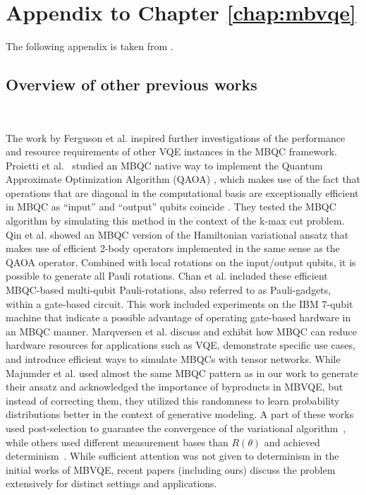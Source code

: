 \documentclass[../main.tex]{subfiles}
\begin{document}
\section{Appendix to Chapter \ref{chap:mbvqe}}

The following appendix is taken from \cite{schroeder2024deterministic}.

\subsection{Overview of other previous works}~\label{app:overview}

The work by Ferguson et al. \cite{ferguson2021measurement} inspired further investigations of the performance and resource requirements of other VQE instances in the MBQC framework. Proietti et al.~\cite{proietti2022native} studied an MBQC native way to implement the Quantum Approximate Optimization Algorithm (QAOA) \cite{farhi2014a}, which makes use of the fact that operations that are diagonal in the computational basis are exceptionally efficient in MBQC as ``input'' and  ``output'' qubits coincide \cite{browne2006one}. They tested the MBQC algorithm by simulating this method in the context of the k-max cut problem.
Qin et al. \cite{qin2023applicability} showed an MBQC version of the Hamiltonian variational ansatz \cite{wecker2015progress} that makes use of efficient 2-body operators implemented in the same sense as the QAOA operator. Combined with local rotations on the input/output qubits, it is possible to generate all Pauli rotations.
Chan et al. \cite{chan2023hybrid} included these efficient MBQC-based multi-qubit Pauli-rotations, also referred to as Pauli-gadgets, within a gate-based circuit. This work included experiments on the IBM 7-qubit machine that indicate a possible advantage of operating gate-based hardware in an MBQC manner.
Marqversen et al. \cite{marqversen2023applications} discuss and exhibit how MBQC can reduce hardware resources for applications such as VQE, demonstrate specific use cases, and introduce efficient ways to simulate MBQCs with tensor networks.
While Majumder et al. \cite{majumder2023variational} used almost the same MBQC pattern as in our work to generate their ansatz and acknowledged the importance of byproducts in MBVQE, but instead of correcting them, they utilized this randomness to learn probability distributions better in the context of generative modeling. A part of these works used post-selection to guarantee the convergence of the variational algorithm~\cite{ferguson2021measurement, proietti2022native}, while others used different measurement bases than $R(\theta)$ and achieved determinism~\cite{chan2023hybrid, huang2022near, marqversen2023applications}. While sufficient attention was not given to determinism in the initial works of MBVQE, recent papers (including ours) discuss the problem extensively for distinct settings and applications. 
\end{document}
